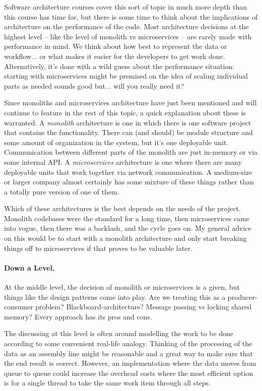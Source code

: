 Software architecture courses cover this sort of topic in much more depth than this course has time for, but there is some time to think about the implications of architecture on the performance of the code. Most architecture decisions at the highest level -- like the level of monolith vs microservices -- are rarely made with performance in mind. We think about how best to represent the data or workflow... or what makes it easier for the developers to get work done. Alternatively, it's done with a wild guess about the performance situation: starting with microservices might be premised on the idea of scaling individual parts as needed sounds good but... will you really need it?

Since monoliths and microservices architecture have just been mentioned and will continue to feature in the rest of this topic, a quick explanation about these is warranted. A \textit{monolith} architecture is one in which there is one software project that contains the functionality. There can (and should) be module structure and some amount of organization in the system, but it's one deployable unit. Communication between different parts of the monolith are just in-memory or via some internal API. A \textit{microservices} architecture is one where there are many deployable units that work together via network communication. A medium-size or larger company almost certainly has some mixture of these things rather than a totally pure version of one of them. 

Which of these architectures is the best depends on the needs of the project. Monolith codebases were the standard for a long time, then microservices came into vogue, then there was a backlash, and the cycle goes on. My general advice on this would be to start with a monolith architecture and only start breaking things off to microservices if that proves to be valuable later.

\paragraph{Down a Level.} At the middle level, the decision of monolith or microservices is a given, but things like the design patterns come into play. Are we treating this as a producer-consumer problem? Blackboard-architecture? Message passing vs locking shared memory? Every approach has its pros and cons.

The discussing at this level is often around modelling the work to be done according to some convenient real-life analogy. Thinking of the processing of the data as an assembly line might be reasonable and a great way to make sure that the end result is correct. However, an implementation where the data moves from queue to queue could increase the overhead costs where the most efficient option is for a single thread to take the same work item through all steps. 

